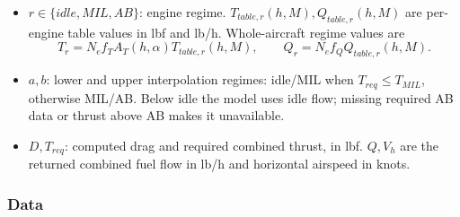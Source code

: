 \documentclass[10pt,a4paper]{amsart}
\begin{document}
\begin{itemize}
used when enabled; otherwise 1.
\item $r\in\{idle,MIL,AB\}$: engine regime.
$T_{table,r}(h,M),Q_{table,r}(h,M)$ are per-engine table values in lbf
and lb/h. Whole-aircraft regime values are
\[
 T_r=N_e f_T A_T(h,\alpha)T_{table,r}(h,M),\qquad
 Q_r=N_e f_Q Q_{table,r}(h,M).
\]
\item $a,b$: lower and upper interpolation regimes: idle/MIL when
$T_{req}\leq T_{MIL}$, otherwise MIL/AB. Below idle the model uses idle
flow; missing required AB data or thrust above AB makes it unavailable.
\item $D,T_{req}$: computed drag and required combined thrust, in lbf.
$Q,V_h$ are the returned combined fuel flow in lb/h and horizontal
airspeed in knots.
\end{itemize}

\subsubsection*{Data}
\end{document}

